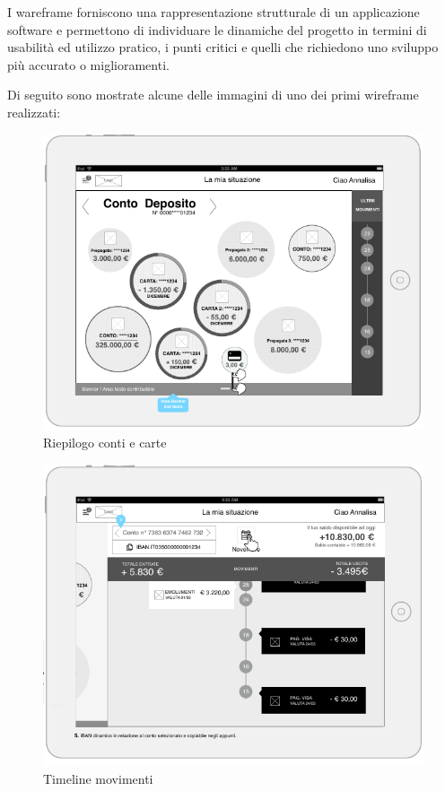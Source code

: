 I wareframe forniscono una rappresentazione strutturale di un applicazione software e permettono di individuare le dinamiche del progetto in termini di usabilità ed utilizzo pratico, i punti critici e quelli che richiedono uno sviluppo più accurato o miglioramenti.

Di seguito sono mostrate alcune delle immagini di uno dei primi wireframe realizzati:

\begin{figure}[!htbp]
\centering
\includegraphics[scale=1.0]{primo_wireframe/miasituazione.png}
\caption{Riepilogo conti e carte}
\end{figure}
\begin{figure}[!htpb]
\centering
\includegraphics[scale=1.0]{primo_wireframe/timeline2.png}
\caption{Timeline movimenti}
\end{figure}
